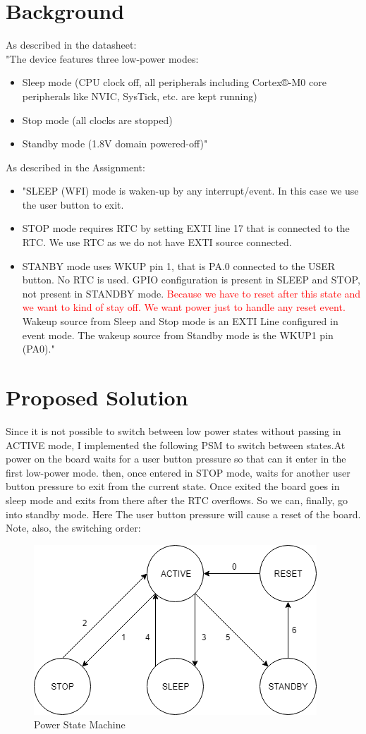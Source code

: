 \documentclass[peerreview]{IEEEtran}
\begin{document}
\section{Background}
As described in the datasheet:\\
"The device features three low-power modes:
\begin{itemize}
\item Sleep mode (CPU clock off, all peripherals including Cortex®-M0 core peripherals like
NVIC, SysTick, etc. are kept running)
\item Stop mode (all clocks are stopped)
\item Standby mode (1.8V domain powered-off)"
\end{itemize}
As described in the Assignment:
\begin{itemize}
\item "SLEEP (WFI) mode is waken-up by any interrupt/event. In this case we use the user button to exit.
\item STOP mode requires RTC by setting EXTI line 17 that is connected to the RTC. We use RTC as we do not have EXTI source connected.
\item STANBY mode uses WKUP pin 1, that is PA.0 connected to the USER button. No RTC is used.
GPIO configuration is present in SLEEP and STOP, not present in STANDBY mode. \textcolor{red}{Because we have to reset after this state and we want to kind of stay off. We want power just to handle any reset event.} Wakeup source from Sleep and Stop mode is an EXTI Line configured in event mode. The wakeup source from
Standby mode is the WKUP1 pin (PA0)."
\end{itemize}
\section{Proposed Solution}
Since it is not possible to switch between low power states without passing in ACTIVE mode, I implemented the following PSM to switch between states.At power on the board waits for a user button pressure so that can it enter in the first low-power mode. then, once entered in STOP mode, waits for another user button pressure to exit from the current state. Once exited the board goes in sleep mode and exits from there after the RTC overflows. So we can, finally, go into standby mode. Here The user button pressure will cause a reset of the board. Note, also, the switching order:
\begin{figure}[!ht]
\centering
\includegraphics[width=0.8\columnwidth]{psm} 
\caption{Power State Machine}
\label{fig_sim}
\end{figure} 
\end{document}
